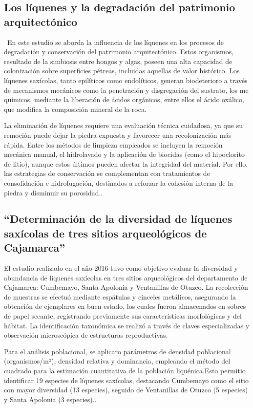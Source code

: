 \subsection{Los líquenes y la degradación del patrimonio arquitectónico}\
En este estudio se aborda la influencia de los líquenes en los procesos de degradación y conservación del patrimonio arquitectónico. Estos organismos, resultado de la simbiosis entre hongos y algas, poseen una alta capacidad de colonización sobre superficies pétreas, incluidas aquellas de valor histórico. Los líquenes saxícolas, tanto epilíticos como endolíticos, generan biodeterioro a través de mecanismos mecánicos como la penetración y disgregación del sustrato, los me químicos, mediante la liberación de ácidos orgánicos, entre ellos el ácido oxálico, que modifica la composición mineral de la roca.

La eliminación de líquenes requiere una evaluación técnica cuidadosa, ya que su remoción puede dejar la piedra expuesta y favorecer una recolonización más rápida. Entre los métodos de limpieza empleados se incluyen la remoción mecánica manual, el hidrolavado y la aplicación de biocidas (como el hipoclorito de litio), aunque estos últimos pueden afectar la integridad del material. Por ello, las estrategias de conservación se complementan con tratamientos de consolidación e hidrofugación, destinados a reforzar la cohesión interna de la piedra y disminuir su porosidad.\cite[Gamboa Osorio et al., 2017]{Gamboa2017}.
\subsection{“Determinación de la diversidad de líquenes saxícolas de tres sitios arqueológicos de Cajamarca”}
El estudio realizado en el año 2016 tuvo como objetivo evaluar la diversidad y abundancia de líquenes saxícolas en tres sitios arqueológicos del departamento de Cajamarca: Cumbemayo, Santa Apolonia y Ventanillas de Otuzco. La recolección de muestras se efectuó mediante espátulas y cinceles metálicos, asegurando la obtención de ejemplares en buen estado, los cuales fueron almacenados en sobres de papel secante, registrando previamente sus características morfológicas y del hábitat. La identificación taxonómica se realizó a través de claves especializadas y observación microscópica de estructuras reproductivas.

Para el análisis poblacional, se aplicaro parámetros de densidad poblacional (organismos/m²), densidad relativa y dominancia, empleando el método del cuadrado para la estimación cuantitativa de la población liquénica.Esto permitio identificar 19 especies de líquenes saxícolas, destacando Cumbemayo como el sitio con mayor diversidad (13 especies), seguido de Ventanillas de Otuzco (5 especies) y Santa Apolonia (3 especies).\cite{MarinoValle2016}.
